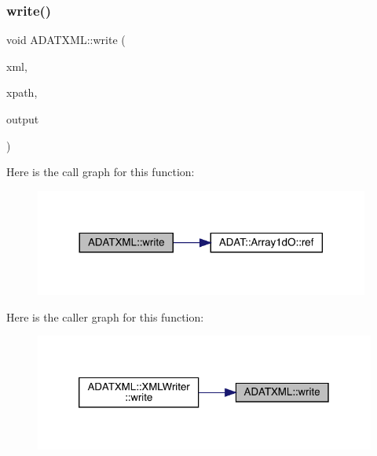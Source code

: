 \subsubsection{\texorpdfstring{write()}{write()}\hspace{0.1cm}{\footnotesize\ttfamily [58/58]}}
{\footnotesize\ttfamily void A\+D\+A\+T\+X\+M\+L\+::write (\begin{DoxyParamCaption}\item[{\mbox{\hyperlink{classADATXML_1_1XMLWriter}{X\+M\+L\+Writer}} \&}]{xml,  }\item[{const std\+::string \&}]{xpath,  }\item[{const \mbox{\hyperlink{classADAT_1_1Array1dO}{Array1dO}}$<$ bool $>$ \&}]{output }\end{DoxyParamCaption})}

Here is the call graph for this function\+:\nopagebreak
\begin{figure}[H]
\begin{center}
\leavevmode
\includegraphics[width=312pt]{d2/da3/group__io_ga17afd14eb981c71780dc1b0074758afc_cgraph}
\end{center}
\end{figure}
Here is the caller graph for this function\+:\nopagebreak
\begin{figure}[H]
\begin{center}
\leavevmode
\includegraphics[width=320pt]{d2/da3/group__io_ga17afd14eb981c71780dc1b0074758afc_icgraph}
\end{center}
\end{figure}
